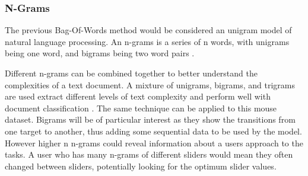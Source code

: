\documentclass{article}
\begin{document}

\subsubsection{N-Grams}

The previous Bag-Of-Words method would be considered an unigram model of natural language processing.
An n-grams is a series of n words, with unigrams being one word, and bigrams being two word pairs \cite{keselj2009speech}.

Different n-grams can be combined together to better understand the complexities of a text document.
A mixture of unigrams, bigrams, and trigrams are used extract different levels of text complexity and perform well with document classification \cite{aggarwal2012survey}.
The same technique can be applied to this mouse dataset.
Bigrams will be of particular interest as they show the transitions from one target to another, thus adding some sequential data to be used by the model.
However higher n n-grams could reveal information about a users approach to the tasks.
A user who has many n-grams of different sliders would mean they often changed between sliders, potentially looking for the optimum slider values.
\end{document}
